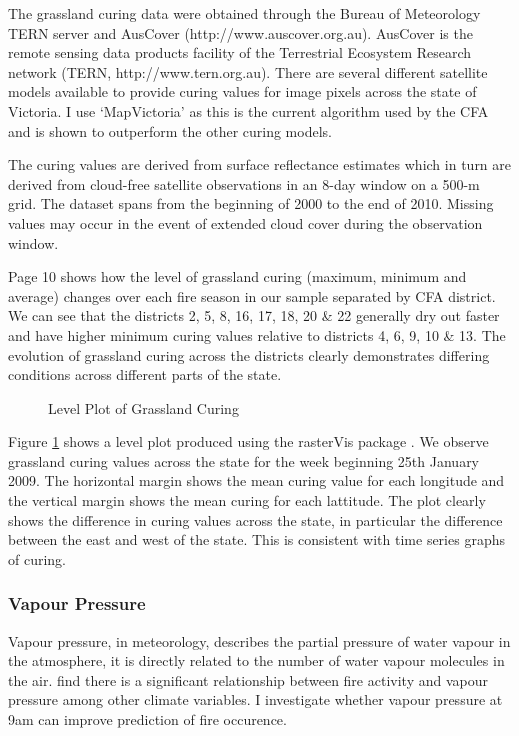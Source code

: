 \documentclass[11pt,a4paper]{article}
\begin{document}
The grassland curing data were obtained through the Bureau of Meteorology TERN server and AusCover (http://www.auscover.org.au). AusCover is the remote sensing data products facility of the Terrestrial Ecosystem Research network (TERN, http://www.tern.org.au). There are several different satellite models available to provide curing values for image pixels across the state of Victoria. I use `MapVictoria' \citep{martin15} as this is the current algorithm used by the CFA and is shown to outperform the other curing models. 

The curing values are derived from surface reflectance estimates which in turn are derived from cloud-free satellite observations in an 8-day window on a 500-m grid. The dataset spans from the beginning of 2000 to the end of 2010. Missing values may occur in the event of extended cloud cover during the observation window.

Page 10 shows how the level of grassland curing (maximum, minimum and average) changes over each fire season in our sample separated by CFA district. We can see that the districts 2, 5, 8, 16, 17, 18, 20 \&  22 generally dry out faster and have higher minimum curing values relative to districts 4, 6, 9, 10 \& 13. The evolution of grassland curing across the districts clearly demonstrates differing conditions across different parts of the state. 

%


\begin{figure}[h]
	\centering 
	\caption{Level Plot of Grassland Curing } 
	\label{fig:cur_lp} 
\end{figure}


Figure \ref{fig:cur_lp} shows a level plot produced using the rasterVis package \citep{rastervis}. We observe grassland curing values across the state for the week beginning 25th January 2009. The horizontal margin shows the mean curing value for each longitude and the vertical margin shows the mean curing for each lattitude. The plot clearly shows the difference in curing values across the state, in particular the difference between the east and west of the state. This is consistent with time series graphs of curing. 

\subsubsection{Vapour Pressure}
Vapour pressure, in meteorology, describes the partial pressure of water vapour in the atmosphere, it is directly related to the number of water vapour molecules in the air.  \citet{harris14} find there is a significant relationship between fire activity and vapour pressure among other climate variables. I investigate whether vapour pressure at 9am can improve prediction of fire occurence. 
\end{document}
